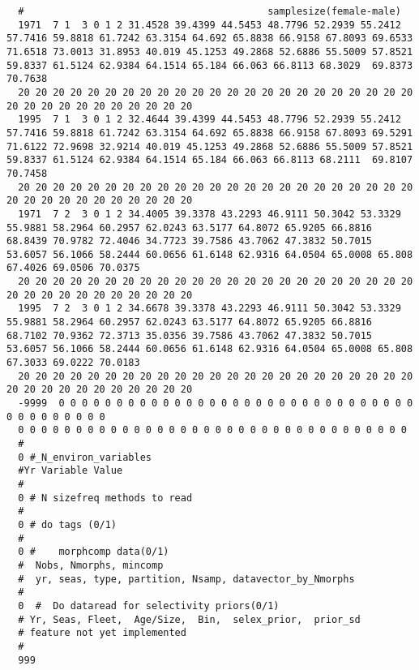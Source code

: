 \begin{landscape}
{\begin{verbatim}
  #                                          samplesize(female-male)
  1971  7 1  3 0 1 2 31.4528 39.4399 44.5453 48.7796 52.2939 55.2412 57.7416 59.8818 61.7242 63.3154 64.692 65.8838 66.9158 67.8093 69.6533 71.6518 73.0013 31.8953 40.019 45.1253 49.2868 52.6886 55.5009 57.8521 59.8337 61.5124 62.9384 64.1514 65.184 66.063 66.8113 68.3029  69.8373 70.7638
  20 20 20 20 20 20 20 20 20 20 20 20 20 20 20 20 20 20 20 20 20 20 20 20 20 20 20 20 20 20 20 20 20 20
  1995  7 1  3 0 1 2 32.4644 39.4399 44.5453 48.7796 52.2939 55.2412 57.7416 59.8818 61.7242 63.3154 64.692 65.8838 66.9158 67.8093 69.5291 71.6122 72.9698 32.9214 40.019 45.1253 49.2868 52.6886 55.5009 57.8521 59.8337 61.5124 62.9384 64.1514 65.184 66.063 66.8113 68.2111  69.8107 70.7458
  20 20 20 20 20 20 20 20 20 20 20 20 20 20 20 20 20 20 20 20 20 20 20 20 20 20 20 20 20 20 20 20 20 20
  1971  7 2  3 0 1 2 34.4005 39.3378 43.2293 46.9111 50.3042 53.3329 55.9881 58.2964 60.2957 62.0243 63.5177 64.8072 65.9205 66.8816 68.8439 70.9782 72.4046 34.7723 39.7586 43.7062 47.3832 50.7015 53.6057 56.1066 58.2444 60.0656 61.6148 62.9316 64.0504 65.0008 65.808   67.4026 69.0506 70.0375
  20 20 20 20 20 20 20 20 20 20 20 20 20 20 20 20 20 20 20 20 20 20 20 20 20 20 20 20 20 20 20 20 20 20
  1995  7 2  3 0 1 2 34.6678 39.3378 43.2293 46.9111 50.3042 53.3329 55.9881 58.2964 60.2957 62.0243 63.5177 64.8072 65.9205 66.8816 68.7102 70.9362 72.3713 35.0356 39.7586 43.7062 47.3832 50.7015 53.6057 56.1066 58.2444 60.0656 61.6148 62.9316 64.0504 65.0008 65.808   67.3033 69.0222 70.0183
  20 20 20 20 20 20 20 20 20 20 20 20 20 20 20 20 20 20 20 20 20 20 20 20 20 20 20 20 20 20 20 20 20 20
  -9999  0 0 0 0 0 0 0 0 0 0 0 0 0 0 0 0 0 0 0 0 0 0 0 0 0 0 0 0 0 0 0 0 0 0 0 0 0 0 0 0
  0 0 0 0 0 0 0 0 0 0 0 0 0 0 0 0 0 0 0 0 0 0 0 0 0 0 0 0 0 0 0 0 0 0
  #
  0 #_N_environ_variables
  #Yr Variable Value
  #
  0 # N sizefreq methods to read 
  #
  0 # do tags (0/1)
  #
  0 #    morphcomp data(0/1) 
  #  Nobs, Nmorphs, mincomp
  #  yr, seas, type, partition, Nsamp, datavector_by_Nmorphs
  #
  0  #  Do dataread for selectivity priors(0/1)
  # Yr, Seas, Fleet,  Age/Size,  Bin,  selex_prior,  prior_sd
  # feature not yet implemented
  #
  999
  

\end{verbatim}}
\end{landscape}
